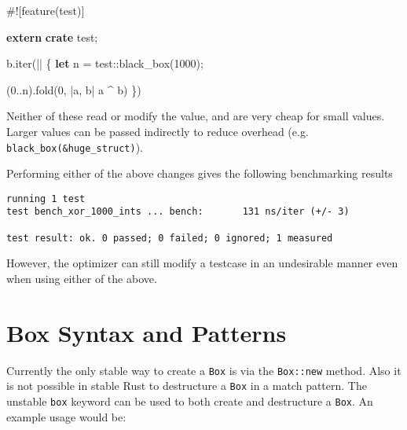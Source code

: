 \documentclass[a4paper,]{book}
\newenvironment{Shaded}{\begin{snugshade}}{\end{snugshade}}
\newcommand{\KeywordTok}[1]{\textcolor[rgb]{0.13,0.29,0.53}{\textbf{{#1}}}}
\newcommand{\DecValTok}[1]{\textcolor[rgb]{0.00,0.00,0.81}{{#1}}}
\newcommand{\AttributeTok}[1]{\textcolor[rgb]{0.77,0.63,0.00}{{#1}}}
\newcommand{\NormalTok}[1]{{#1}}
\begin{document}
\begin{Shaded}
\begin{Highlighting}[]
\AttributeTok{#![}\NormalTok{feature}\AttributeTok{(}\NormalTok{test}\AttributeTok{)]}

\KeywordTok{extern} \KeywordTok{crate} \NormalTok{test;}

\NormalTok{b.iter(|| \{}
    \KeywordTok{let} \NormalTok{n = test::black_box(}\DecValTok{1000}\NormalTok{);}

    \NormalTok{(}\DecValTok{0.}\NormalTok{.n).fold(}\DecValTok{0}\NormalTok{, |a, b| a ^ b)}
\NormalTok{\})}
\end{Highlighting}
\end{Shaded}

Neither of these read or modify the value, and are very cheap for small
values. Larger values can be passed indirectly to reduce overhead (e.g.
\texttt{black\_box(\&huge\_struct)}).

Performing either of the above changes gives the following benchmarking
results

\begin{verbatim}
running 1 test
test bench_xor_1000_ints ... bench:       131 ns/iter (+/- 3)

test result: ok. 0 passed; 0 failed; 0 ignored; 1 measured
\end{verbatim}

However, the optimizer can still modify a testcase in an undesirable
manner even when using either of the above.

\section{Box Syntax and Patterns}\label{sec--box-syntax-and-patterns}

Currently the only stable way to create a \texttt{Box} is via the
\texttt{Box::new} method. Also it is not possible in stable Rust to
destructure a \texttt{Box} in a match pattern. The unstable \texttt{box}
keyword can be used to both create and destructure a \texttt{Box}. An
example usage would be:
\end{document}
